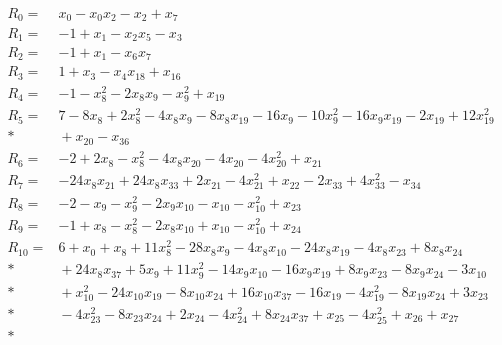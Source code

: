 \begingroup
\fontsize{10}{12}\selectfont
\allowdisplaybreaks[4]
\setlength{\jot}{2pt}
\begin{align*}
R_{0} ={}& x_{0} - x_{0}x_{2} - x_{2} + x_{7} \\[4pt]
R_{1} ={}& -1 + x_{1} - x_{2}x_{5} - x_{3} \\[4pt]
R_{2} ={}& -1 + x_{1} - x_{6}x_{7} \\[4pt]
R_{3} ={}& 1 + x_{3} - x_{4}x_{18} + x_{16} \\[4pt]
R_{4} ={}& -1 - x_{8}^{2} - 2x_{8}x_{9} - x_{9}^{2} + x_{19} \\[4pt]
R_{5} ={}& 7 - 8x_{8} + 2x_{8}^{2} - 4x_{8}x_{9} - 8x_{8}x_{19} - 16x_{9} - 10x_{9}^{2} - 16x_{9}x_{19} - 2x_{19} + 12x_{19}^{2} \\*
&{} + x_{20} - x_{36} \\[4pt]
R_{6} ={}& -2 + 2x_{8} - x_{8}^{2} - 4x_{8}x_{20} - 4x_{20} - 4x_{20}^{2} + x_{21} \\[4pt]
R_{7} ={}& -24x_{8}x_{21} + 24x_{8}x_{33} + 2x_{21} - 4x_{21}^{2} + x_{22} - 2x_{33} + 4x_{33}^{2} - x_{34} \\[4pt]
R_{8} ={}& -2 - x_{9} - x_{9}^{2} - 2x_{9}x_{10} - x_{10} - x_{10}^{2} + x_{23} \\[4pt]
R_{9} ={}& -1 + x_{8} - x_{8}^{2} - 2x_{8}x_{10} + x_{10} - x_{10}^{2} + x_{24} \\[4pt]
R_{10} ={}& 6 + x_{0} + x_{8} + 11x_{8}^{2} - 28x_{8}x_{9} - 4x_{8}x_{10} - 24x_{8}x_{19} - 4x_{8}x_{23} + 8x_{8}x_{24} \\*
&{} + 24x_{8}x_{37} + 5x_{9} + 11x_{9}^{2} - 14x_{9}x_{10} - 16x_{9}x_{19} + 8x_{9}x_{23} - 8x_{9}x_{24} - 3x_{10} \\*
&{} + x_{10}^{2} - 24x_{10}x_{19} - 8x_{10}x_{24} + 16x_{10}x_{37} - 16x_{19} - 4x_{19}^{2} - 8x_{19}x_{24} + 3x_{23} \\*
&{} - 4x_{23}^{2} - 8x_{23}x_{24} + 2x_{24} - 4x_{24}^{2} + 8x_{24}x_{37} + x_{25} - 4x_{25}^{2} + x_{26} + x_{27} \\*

\end{align*}
